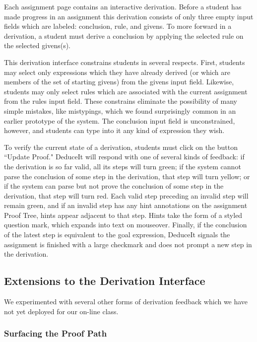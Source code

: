 \documentclass{sigchi}
\begin{document}
Each assignment page contains an interactive derivation. Before a student has made progress in an assignment this derivation consists of only three empty input fields which are labeled: conclusion, rule, and givens. To more forward in a derivation, a student must derive a conclusion by applying the selected rule on the selected givens(s). 

This derivation interface constrains students in several respects. First, students may select only expressions which they have already derived (or which are members of the set of starting givens) from the givens input field. Likewise, students may only select rules which are associated with the current assignment from the rules input field. These constrains eliminate the possibility of many simple mistakes, like mistypings, which we found surprisingly common in an earlier prototype of the system. The conclusion input field is unconstrained, however, and students can type into it any kind of expression they wish.

To verify the current state of a derivation, students must click on the button ``Update Proof." DeduceIt will respond with one of several kinds of feedback: if the derivation is so far valid, all its steps will turn green; if the system cannot parse the conclusion of some step in the derivation, that step will turn yellow; or if the system can parse but not prove the conclusion of some step in the derivation, that step will turn red. Each valid step preceding an invalid step will remain green, and if an invalid step has any hint annotations on the assignment Proof Tree, hints appear adjacent to that step. Hints take the form of a styled question mark, which expands into text on mouseover. Finally, if the conclusion of the latest step is equivalent to the goal expression, DeduceIt signals the assignment is finished with a large checkmark and does not prompt a new step in the derivation.

\subsection{Extensions to the Derivation Interface}

We experimented with several other forms of derivation feedback which we have not yet deployed for our on-line class.

\subsubsection{Surfacing the Proof Path}
\end{document}
